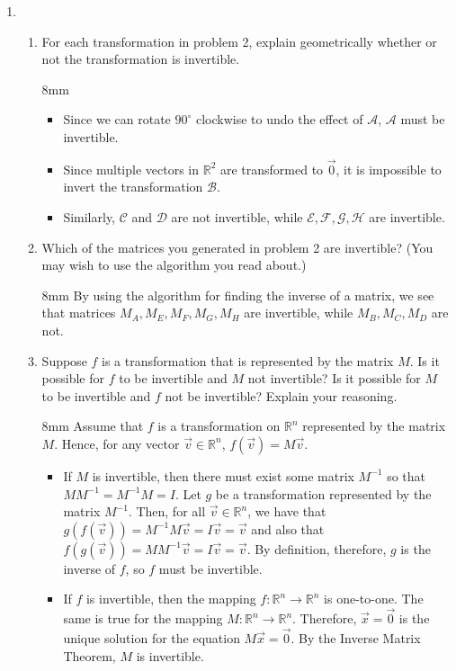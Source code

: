 \documentclass[letter]{article}
\newcommand{\R}{\mathbb{R}}
\newenvironment{answer}{
	\begin{adjustwidth}{8mm}{} \vspace{2mm}}{\end{adjustwidth} \vspace{2mm}
}
\theoremstyle{plain}
\theoremstyle{definition}
\theoremstyle{remark}
\begin{document}
\begin{enumerate}
		
		\item \begin{enumerate}
			\item For each transformation in problem 2, explain geometrically whether or not the transformation is invertible.
			\begin{answer}
				\begin{itemize}
					\item Since we can rotate $90^\circ$ clockwise to undo the effect of $\mathcal{A}$, $\mathcal{A}$ must be invertible. 
					\item Since multiple vectors in $\R^2$ are transformed to $\vec{0}$, it is impossible to invert the transformation $\mathcal{B}$. 
					\item Similarly, $\mathcal{C}$ and $\mathcal{D}$ are not invertible, while $\mathcal{E}, \mathcal{F}, \mathcal{G}, \mathcal{H}$ are invertible. 
				\end{itemize}
			\end{answer}
			\item Which of the matrices you generated in problem 2 are invertible?  (You may wish to use the algorithm you read about.)
			\begin{answer}
				By using the algorithm for finding the inverse of a matrix, we see that matrices $M_A, M_E, M_F, M_G, M_H$ are invertible, while $M_B, M_C, M_D$ are not. 
			\end{answer}
			\item Suppose $f$ is a transformation that is represented by the matrix $M$.
				Is it possible for $f$ to be invertible and $M$ not invertible?  Is it possible
				for $M$ to be invertible and $f$ not be invertible? Explain your reasoning.
			\begin{answer}
				Assume that $f$ is a transformation on $\R^n$ represented by the matrix $M$. Hence, for any vector $\vec{v} \in \R^n$, $f(\vec{v}) = M\vec{v}$. 
				\begin{itemize}
					\item If $M$ is invertible, then there must exist some matrix $M^{-1}$ so that $MM^{-1} = M^{-1}M = I$. Let $g$ be a transformation represented by the matrix $M^{-1}$. Then, for all $\vec{v} \in \R^n$, we have that $g(f(\vec{v})) = M^{-1} M \vec{v} = I \vec{v} = \vec{v}$ and also that $f(g(\vec{v})) = MM^{-1}\vec{v} = I \vec{v} = \vec{v}$. By definition, therefore, $g$ is the inverse of $f$, so $f$ must be invertible. 
					\item If $f$ is invertible, then the mapping $f: \R^n \to \R^n$ is one-to-one. The same is true for the mapping $M: \R^n \to \R^n$. Therefore, $\vec{x} = \vec{0}$ is the unique solution for the equation $M\vec{x} = \vec{0}$. By the Inverse Matrix Theorem, $M$ is invertible. 
				\end{itemize}
			\end{answer}
		\end{enumerate}
		

\end{enumerate}
\end{document}
